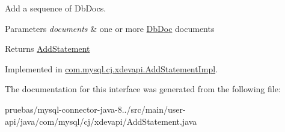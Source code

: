 Add a sequence of Db\+Docs.


\begin{DoxyParams}{Parameters}
{\em documents} & one or more \mbox{\hyperlink{interfacecom_1_1mysql_1_1cj_1_1xdevapi_1_1_db_doc}{Db\+Doc}} documents \\
\hline
\end{DoxyParams}
\begin{DoxyReturn}{Returns}
\mbox{\hyperlink{interfacecom_1_1mysql_1_1cj_1_1xdevapi_1_1_add_statement}{Add\+Statement}} 
\end{DoxyReturn}


Implemented in \mbox{\hyperlink{classcom_1_1mysql_1_1cj_1_1xdevapi_1_1_add_statement_impl_a59bdfcc8a26ee55966f9a1ad5a7b2303}{com.\+mysql.\+cj.\+xdevapi.\+Add\+Statement\+Impl}}.



The documentation for this interface was generated from the following file\+:\begin{DoxyCompactItemize}
\item 
pruebas/mysql-\/connector-\/java-\/8../src/main/user-\/api/java/com/mysql/cj/xdevapi/Add\+Statement.\+java\end{DoxyCompactItemize}
